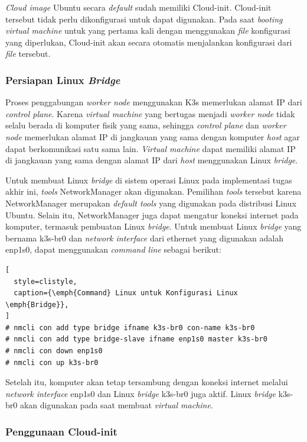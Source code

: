 \emph{Cloud image} Ubuntu secara \emph{default} sudah memiliki Cloud-init. Cloud-init tersebut
tidak perlu dikonfigurasi untuk dapat digunakan. Pada saat \emph{booting virtual machine} untuk yang
pertama kali dengan menggunakan \emph{file} konfigurasi yang diperlukan, Cloud-init akan secara otomatis
menjalankan konfigurasi dari \emph{file} tersebut.

\subsubsection{Persiapan Linux \emph{Bridge}}
\label{sec:persiapan-linux-bridge}

Proses penggabungan \emph{worker node} menggunakan K3s memerlukan alamat IP
dari \emph{control plane}. Karena \emph{virtual machine} yang bertugas menjadi
\emph{worker node} tidak selalu berada di komputer fisik yang sama, sehingga
\emph{control plane} dan \emph{worker node} memerlukan alamat IP di jangkauan
yang sama dengan komputer \emph{host} agar dapat berkomunikasi satu sama lain.
\emph{Virtual machine} dapat memiliki alamat IP di jangkauan yang sama dengan
alamat IP dari \emph{host} menggunakan Linux \emph{bridge}.

Untuk membuat Linux \emph{bridge} di sistem operasi Linux pada implementasi tugas akhir ini,
\emph{tools} NetworkManager akan digunakan. Pemilihan \emph{tools} tersebut karena
NetworkManager merupakan \emph{default tools} yang digunakan pada distribusi Linux
Ubuntu. Selain itu, NetworkManager juga dapat mengatur koneksi internet pada
komputer, termasuk pembuatan Linux \emph{bridge}. Untuk membuat Linux \emph{bridge}
yang bernama k3s-br0 dan \emph{network interface} dari ethernet yang digunakan
adalah enp1s0, dapat menggunakan \emph{command line} sebagai berikut:

\begin{lstlisting}[
  style=clistyle,
  caption={\emph{Command} Linux untuk Konfigurasi Linux \emph{Bridge}},
]
# nmcli con add type bridge ifname k3s-br0 con-name k3s-br0
# nmcli con add type bridge-slave ifname enp1s0 master k3s-br0
# nmcli con down enp1s0
# nmcli con up k3s-br0
\end{lstlisting}

Setelah itu, komputer akan tetap tersambung dengan koneksi internet melalui
\emph{network interface} enp1s0 dan Linux \emph{bridge} k3s-br0 juga aktif.
Linux \emph{bridge} k3s-br0 akan digunakan pada saat membuat \emph{virtual machine}.
\subsubsection{Penggunaan Cloud-init}
\label{sec:implementasi-cloud-init}

